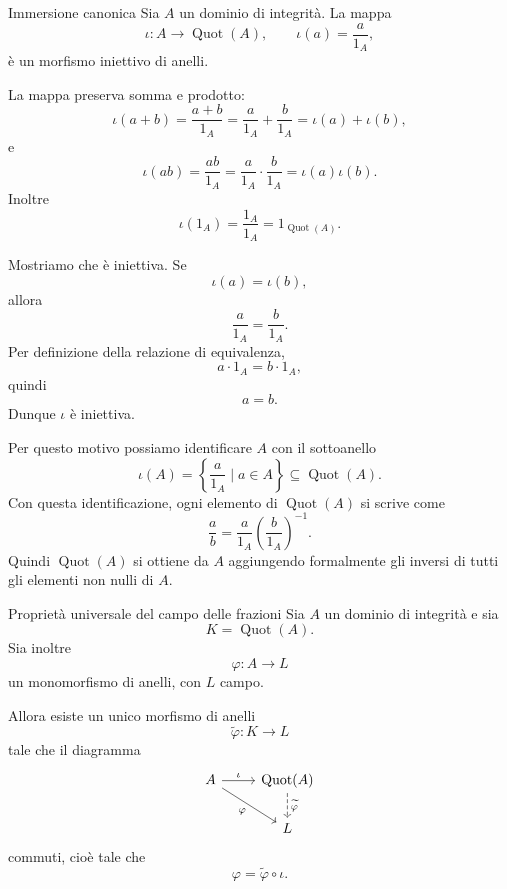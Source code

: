 \documentclass[a4paper]{article}
\begin{document}
\begin{radioactive}
\begin{snippetproposition}{Immersione canonica}
    Sia \(A\) un dominio di integrità. La mappa
    \[
        \iota\colon A\to \operatorname{Quot}(A),
        \qquad
        \iota(a)=\frac{a}{1_A},
    \]
    è un morfismo iniettivo di anelli.
\end{snippetproposition}
\end{radioactive}

\begin{radioactive}
\begin{snippetproof}{}
    La mappa preserva somma e prodotto:
    \[
        \iota(a+b)
        =
        \frac{a+b}{1_A}
        =
        \frac{a}{1_A}+\frac{b}{1_A}
        =
        \iota(a)+\iota(b),
    \]
    e
    \[
        \iota(ab)
        =
        \frac{ab}{1_A}
        =
        \frac{a}{1_A}\cdot \frac{b}{1_A}
        =
        \iota(a)\iota(b).
    \]
    Inoltre
    \[
        \iota(1_A)=\frac{1_A}{1_A}=1_{\operatorname{Quot}(A)}.
    \]

    Mostriamo che è iniettiva. Se
    \[
        \iota(a)=\iota(b),
    \]
    allora
    \[
        \frac{a}{1_A}=\frac{b}{1_A}.
    \]
    Per definizione della relazione di equivalenza,
    \[
        a\cdot 1_A=b\cdot 1_A,
    \]
    quindi
    \[
        a=b.
    \]
    Dunque \(\iota\) è iniettiva.
\end{snippetproof}
\end{radioactive}

\begin{radioactive}
Per questo motivo possiamo identificare \(A\) con il sottoanello
\[
    \iota(A)
    =
    \left\{
        \frac{a}{1_A}
        \mid
        a\in A
    \right\}
    \subseteq \operatorname{Quot}(A).
\]
Con questa identificazione, ogni elemento di \(\operatorname{Quot}(A)\) si scrive come
\[
    \frac{a}{b}
    =
    \frac{a}{1_A}
    \left(\frac{b}{1_A}\right)^{-1}.
\]
Quindi \(\operatorname{Quot}(A)\) si ottiene da \(A\) aggiungendo formalmente gli inversi di tutti gli elementi non nulli di \(A\).
\end{radioactive}

\begin{radioactive}
\begin{snippetproposition}{Proprietà universale del campo delle frazioni}
    Sia \(A\) un dominio di integrità e sia
    \[
        K=\operatorname{Quot}(A).
    \]
    Sia inoltre
    \[
        \varphi\colon A\to L
    \]
    un monomorfismo di anelli, con \(L\) campo.

    Allora esiste un unico morfismo di anelli
    \[
        \widetilde{\varphi}\colon K\to L
    \]
    tale che il diagramma
    \[
        \begin{tikzcd}
            A \arrow[r, "\iota"] \arrow[dr, "\varphi"'] & \operatorname{Quot}(A) \arrow[d, dashed, "\widetilde{\varphi}"] \\
            & L
        \end{tikzcd}
    \]
    commuti, cioè tale che
    \[
        \varphi=\widetilde{\varphi}\circ \iota.
    \]
\end{snippetproposition}
\end{radioactive}
\end{document}
